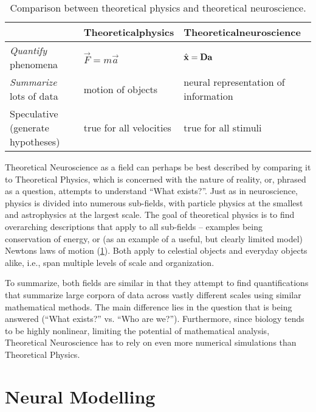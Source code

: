 \documentclass[10pt,letterpaper,oneside]{article}
\begin{document}
\begin{table}[h]
	\centering
	\caption{Comparison between theoretical physics and theoretical neuroscience.}
	\begin{tabular}{p{4cm} p{4cm} p{4cm}}
		\toprule
								  &
								  \textbf{Theoretical\newline physics} & \textbf{Theoretical\newline neuroscience} \\
		\midrule
		\raggedleft\emph{Quantify} phenomena & $\vec{F} = m \vec{a}$ & $\hat{{\mathbf{x}}} = {\mathbf{D}} {\mathbf{a}}$ \\
		\midrule
		\raggedleft \emph{Summarize} lots of data & motion of objects & neural representation of information \\
		\midrule
		\raggedleft Speculative (generate hypotheses) & true for all velocities & true for all stimuli \\
		\bottomrule
	\end{tabular}
	\label{tbl:physics_vs_theoretical_neuroscience}
\end{table}

Theoretical Neuroscience as a field can perhaps be best described by comparing it to Theoretical Physics, which is concerned with the nature of reality, or, phrased as a question, attempts to understand \enquote{What exists?}. Just as in neuroscience, physics is divided into numerous sub-fields, with particle physics at the smallest and astrophysics at the largest scale. The goal of theoretical physics is to find overarching descriptions that apply to all sub-fields -- examples being conservation of energy, or (as an example of a useful, but clearly limited model) Newtons laws of motion (\cref{tbl:physics_vs_theoretical_neuroscience}). Both apply to celestial objects and everyday objects alike, i.e., span multiple levels of scale and organization.

To summarize, both fields are similar in that they attempt to find quantifications that summarize large corpora of data across vastly different scales using similar mathematical methods. The main difference lies in the question that is being answered (\enquote{What exists?} vs. \enquote{Who are we?}). Furthermore, since biology tends to be highly nonlinear, limiting the potential of mathematical analysis, Theoretical Neuroscience has to rely on even more numerical simulations than Theoretical Physics.

\section{Neural Modelling}
\end{document}
